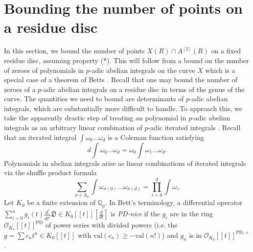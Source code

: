 \documentclass[11pt]{amsart}
\def\Q{\mathbb Q}
\newcommand{\val}{\mathrm{val}}
\theoremstyle{plain}
\newtheorem{lemma}{Lemma}
\theoremstyle{definition}
\begin{document}
%
\section{Bounding the number of points on a residue disc}\label{sec:disk}
In this section, we bound the number of points $X(R)\cap A^{[2]}(R)$ on a fixed residue disc, assuming property (*). This will follow from a bound on the number of zeroes of polynomials in $p$-adic abelian integrals on the curve $X$ which is a special case of a theorem of Betts \cite{betts:weight}. Recall \cite{coleman:chabauty} that one may bound the number of zeroes of a $p$-adic abelian integrals on a residue disc in terms of the genus of the curve. The quantities we need to bound are determinants of $p$-adic abelian integrals, which are substantially more difficult to handle. To approach this, we take the apparently drastic step of treating an polynomial in $p$-adic abelian integrals as an arbitrary linear combination of $p$-adic iterated integrals \cite{besser}. Recall that an iterated integral $\int \omega _0 \ldots \omega _d $ is a Coleman function satisfying 
\[
d\int \omega _0 \ldots \omega _d =\omega _0 \int \omega _1 \ldots \omega _d .
\]
Polynomials in abelian integrals arise as linear combinations of iterated integrals via the shuffle product formula
\[
\sum _{\sigma \in S_n }\int \omega _{\sigma (0)} \ldots \omega _{\sigma (d)} =\prod _{i=0}^d \int \omega _i .
\]
%
Let $K_0$ be a finite extension of $\Q _p $. In Bett's terminology, a differential operator $\sum _{i=0}^n g_i (t)\frac{d^i}{dt^i}\mathfrak{D}\in K_0 [\! [t]\! ][\frac{d}{dt}]$ is \textit{PD-nice} if the $g_i$ are in the ring $\mathcal{O}_{K_0} [\! [t]\! ]^{\mathrm{PD}}$ of power series with divided powers (i.e. the $g=\sum c_n t^n\in K_0 [\! [t]\! ]$ with $\val (c_n )\geq -\val (n!)$) and $g_n $ is in $\mathcal{O}_{K_0} [\! [t]\! ]^{\mathrm{PD},\times }$.
\end{document}
